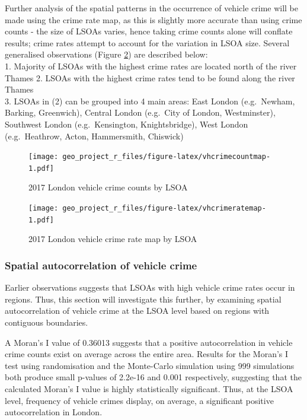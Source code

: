 \documentclass[]{article}
\theoremstyle{definition}
\theoremstyle{definition}
\theoremstyle{definition}
\theoremstyle{remark}
\begin{document}
Further analysis of the spatial patterns in the occurrence of vehicle
crime will be made using the crime rate map, as this is slightly more
accurate than using crime counts - the size of LSOAs varies, hence
taking crime counts alone will conflate results; crime rates attempt to
account for the variation in LSOA size. Several generalised observations
(Figure \ref{fig:vhcrimeratemap}) are described below:\\
1. Majority of LSOAs with the highest crime rates are located north of
the river Thames 2. LSOAs with the highest crime rates tend to be found
along the river Thames\\
3. LSOAs in (2) can be grouped into 4 main areas: East London
(e.g.~Newham, Barking, Greenwich), Central London (e.g.~City of London,
Westminster), Southwest London (e.g.~Kensington, Knightsbridge), West
London (e.g.~Heathrow, Acton, Hammersmith, Chiswick)

\begin{figure}
\centering
\texttt{[image: geo\_project\_r\_files/figure-latex/vhcrimecountmap-1.pdf]}
\caption{\label{fig:vhcrimecountmap}2017 London vehicle crime counts by
LSOA}
\end{figure}

\begin{figure}
\centering
\texttt{[image: geo\_project\_r\_files/figure-latex/vhcrimeratemap-1.pdf]}
\caption{\label{fig:vhcrimeratemap}2017 London vehicle crime rate map by
LSOA}
\end{figure}

\subsubsection{Spatial autocorrelation of vehicle
crime}\label{spatial-autocorrelation-of-vehicle-crime}

Earlier observations suggests that LSOAs with high vehicle crime rates
occur in regions. Thus, this section will investigate this further, by
examining spatial autocorrelation of vehicle crime at the LSOA level
based on regions with contiguous boundaries.

A Moran's I value of 0.36013 suggests that a positive autocorrelation in
vehicle crime counts exist on average across the entire area. Results
for the Moran's I test using randomisation and the Monte-Carlo
simulation using 999 simulations both produce small p-values of 2.2e-16
and 0.001 respectively, suggesting that the calculated Moran's I value
is highly statistically significant. Thus, at the LSOA level, frequency
of vehicle crimes display, on average, a significant positive
autocorrelation in London.
\end{document}
